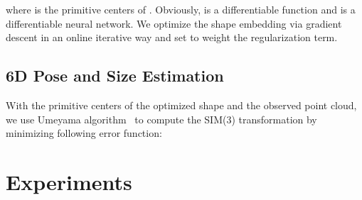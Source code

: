 \documentclass{article}
\begin{document}
where  is the primitive centers of .
Obviously,  is a differentiable function and  is a differentiable neural network. We optimize the shape embedding  via gradient descent in an online iterative way and set  to weight the regularization term. 

\subsection{6D Pose and Size Estimation}
\label{sec:pose}
With the primitive centers  of the optimized shape and the observed point cloud, we use Umeyama algorithm~\cite{Umeyama} to compute the SIM(3) transformation by minimizing following error function:

 \section{Experiments}

\begin{table}[t]\centering
\caption{Comparison of our method with other five SOTA methods~\cite{NOCS,SPD,SGPA,lin2022sar,deng2022icaps} on REAL275 and CAMERA25. `S' is synthetic data and `R' is real data.}

\setlength{\abovecaptionskip}{0.cm}
\setlength{\belowcaptionskip}{0.cm}
\label{tab:nocs}
\end{table}
\end{document}
